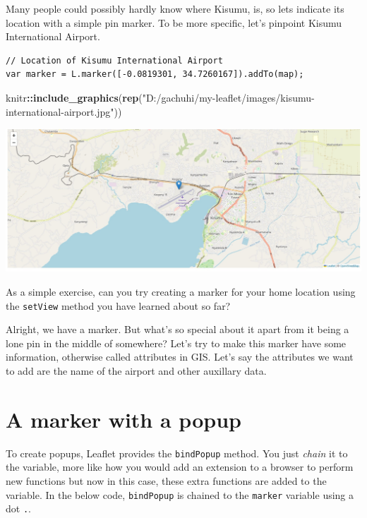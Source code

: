 \documentclass[
]{book}
\newenvironment{Shaded}{\begin{snugshade}}{\end{snugshade}}
\newcommand{\FunctionTok}[1]{\textcolor[rgb]{0.13,0.29,0.53}{\textbf{#1}}}
\newcommand{\NormalTok}[1]{#1}
\newcommand{\SpecialCharTok}[1]{\textcolor[rgb]{0.81,0.36,0.00}{\textbf{#1}}}
\newcommand{\StringTok}[1]{\textcolor[rgb]{0.31,0.60,0.02}{#1}}
\begin{document}
Many people could possibly hardly know where Kisumu, is, so lets indicate its location with a simple pin marker. To be more specific, let's pinpoint Kisumu International Airport.

\begin{verbatim}
// Location of Kisumu International Airport
var marker = L.marker([-0.0819301, 34.7260167]).addTo(map);
\end{verbatim}

\begin{Shaded}
\begin{Highlighting}[]
\NormalTok{knitr}\SpecialCharTok{::}\FunctionTok{include\_graphics}\NormalTok{(}\FunctionTok{rep}\NormalTok{(}\StringTok{"D:/gachuhi/my{-}leaflet/images/kisumu{-}international{-}airport.jpg"}\NormalTok{))}
\end{Highlighting}
\end{Shaded}

\includegraphics{../images/kisumu-international-airport.jpg}

As a simple exercise, can you try creating a marker for your home location using the \texttt{setView} method you have learned about so far?

Alright, we have a marker. But what's so special about it apart from it being a lone pin in the middle of somewhere? Let's try to make this marker have some information, otherwise called attributes in GIS. Let's say the attributes we want to add are the name of the airport and other auxillary data.

\hypertarget{a-marker-with-a-popup}{%
\section{A marker with a popup}\label{a-marker-with-a-popup}}

To create popups, Leaflet provides the \texttt{bindPopup} method. You just \emph{chain} it to the variable, more like how you would add an extension to a browser to perform new functions but now in this case, these extra functions are added to the variable. In the below code, \texttt{bindPopup} is chained to the \texttt{marker} variable using a dot \texttt{.}.
\end{document}
